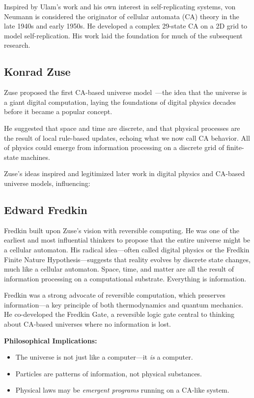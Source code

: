 \documentclass[12pt,english]{article}
\begin{document}
Inspired by Ulam's work and his own interest in self-replicating systems, von Neumann is considered the originator of cellular automata (CA) theory in the late 1940s and early 1950s. He developed a complex 29-state CA on a 2D grid to model self-replication. His work laid the foundation for much of the subsequent research.

\subsection*{Konrad Zuse}
Zuse proposed the first CA-based universe model~\cite{zuse}—the idea that the universe is a giant digital computation, laying the foundations of digital physics decades before it became a popular concept.

He suggested that space and time are discrete, and that physical processes are the result of local rule-based updates, echoing what we now call CA behavior. All of physics could emerge from information processing on a discrete grid of finite-state machines.

Zuse’s ideas inspired and legitimized later work in digital physics and CA-based universe models, influencing:

\subsection*{Edward Fredkin}
Fredkin \cite{fredkin} built upon Zuse’s vision with reversible computing. He was one of the earliest and most influential thinkers to propose that the entire universe might be a cellular automaton. His radical idea—often called digital physics or the Fredkin Finite Nature Hypothesis—suggests that reality evolves by discrete state changes, much like a cellular automaton. Space, time, and matter are all the result of information processing on a computational substrate. Everything is information.

Fredkin was a strong advocate of reversible computation, which preserves information—a key principle of both thermodynamics and quantum mechanics. He co-developed the Fredkin Gate, a reversible logic gate central to thinking about CA-based universes where no information is lost.

\textbf{Philosophical Implications:}
\begin{itemize}
  \item The universe is not just like a computer—it \emph{is} a computer.
  \item Particles are patterns of information, not physical substances.
  \item Physical laws may be \emph{emergent programs} running on a CA-like system.
\end{itemize}
\end{document}
